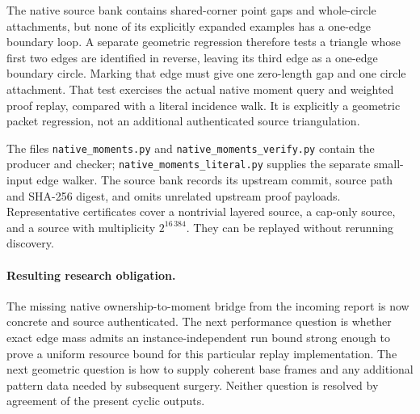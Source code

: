 The native source bank contains shared-corner point gaps and whole-circle
attachments, but none of its explicitly expanded examples has a one-edge
boundary loop.  A separate geometric regression therefore tests a triangle
whose first two edges are identified in reverse, leaving its third edge as
a one-edge boundary circle.  Marking that edge must give one zero-length
gap and one circle attachment.  That test exercises the actual native
moment query and weighted proof replay, compared with a literal incidence
walk.  It is explicitly a geometric packet regression, not an additional
authenticated source triangulation.

The files \texttt{native\_moments.py} and
\texttt{native\_moments\_verify.py} contain the producer and checker;
\texttt{native\_moments\_literal.py} supplies the separate small-input
edge walker.  The source bank records its upstream commit, source path and
SHA-256 digest, and omits unrelated upstream proof payloads.  Representative
certificates cover a nontrivial layered source, a cap-only source, and a
source with multiplicity $2^{16\,384}$.  They can be replayed
without rerunning discovery.

\paragraph{Resulting research obligation.}
The missing native ownership-to-moment bridge from the incoming report is
now concrete and source authenticated.  The next performance question is
whether exact edge mass admits an instance-independent run bound strong
enough to prove a uniform resource bound for this particular replay
implementation.  The next geometric question is how to supply coherent
base frames and any additional pattern data needed by subsequent surgery.
Neither question is resolved by agreement of the present cyclic outputs.
